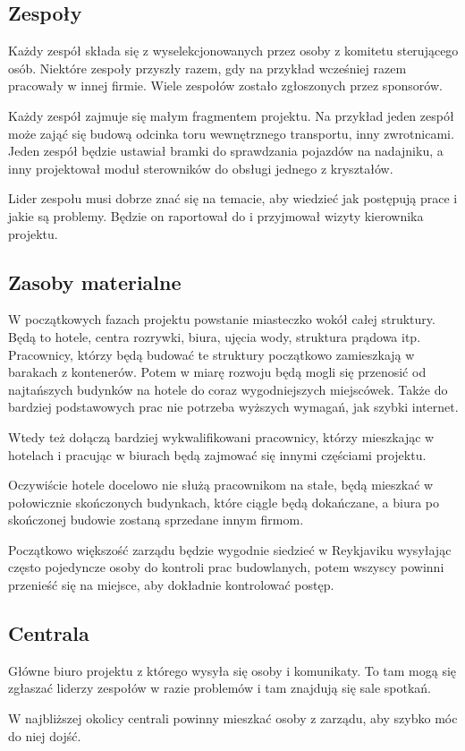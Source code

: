 \subsection{Zespoły}
Każdy zespół składa się z wyselekcjonowanych przez osoby z komitetu sterującego osób.
Niektóre zespoły przyszły razem, gdy na przykład wcześniej razem pracowały w innej firmie.
Wiele zespołów zostało zgłoszonych przez sponsorów.

Każdy zespół zajmuje się małym fragmentem projektu. Na przykład jeden zespół może zająć się budową odcinka toru wewnętrznego transportu, inny zwrotnicami.
Jeden zespół będzie ustawiał bramki do sprawdzania pojazdów na nadajniku, a inny projektował moduł sterowników do obsługi jednego z kryształów.

Lider zespołu musi dobrze znać się na temacie, aby wiedzieć jak postępują prace i jakie są problemy. Będzie on raportował do i przyjmował wizyty kierownika projektu.

\subsection{Zasoby materialne}
W początkowych fazach projektu powstanie miasteczko wokół całej struktury. Będą to hotele, centra rozrywki, biura, ujęcia wody, struktura prądowa itp.
Pracownicy, którzy będą budować te struktury początkowo zamieszkają w barakach z kontenerów. Potem w miarę rozwoju będą mogli się przenosić od najtańszych budynków na hotele do coraz wygodniejszych miejscówek.
Także do bardziej podstawowych prac nie potrzeba wyższych wymagań, jak szybki internet.

Wtedy też dołączą bardziej wykwalifikowani pracownicy, którzy mieszkając w hotelach i pracując w biurach będą zajmować się innymi częściami projektu.

Oczywiście hotele docelowo nie służą pracownikom na stałe, będą mieszkać w połowicznie skończonych budynkach, które ciągle będą dokańczane, a biura po skończonej budowie zostaną sprzedane innym firmom.

Początkowo większość zarządu będzie wygodnie siedzieć w Reykjaviku wysyłając często pojedyncze osoby do kontroli prac budowlanych, potem wszyscy powinni przenieść się na miejsce, aby dokładnie kontrolować postęp.

\subsection{Centrala}
Główne biuro projektu z którego wysyła się osoby i komunikaty.
To tam mogą się zgłaszać liderzy zespołów w razie problemów i tam znajdują się sale spotkań.

W najbliższej okolicy centrali powinny mieszkać osoby z zarządu, aby szybko móc do niej dojść.